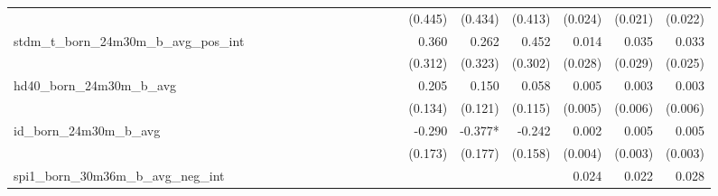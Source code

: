 \begin{tabular}{lrrrrrrrrrrrrrrrrrr}
                                            &              &              &              &              &              &              &              &              &               &              &              &               &      (0.445) &      (0.434) &       (0.413) &      (0.024) &      (0.021) &       (0.022) \\ 
stdm\_t\_born\_24m30m\_b\_avg\_pos\_int     &              &              &              &              &              &              &              &              &               &              &              &               &        0.360 &        0.262 &         0.452 &        0.014 &        0.035 &         0.033 \\ 
                                            &              &              &              &              &              &              &              &              &               &              &              &               &      (0.312) &      (0.323) &       (0.302) &      (0.028) &      (0.029) &       (0.025) \\ 
hd40\_born\_24m30m\_b\_avg                  &              &              &              &              &              &              &              &              &               &              &              &               &        0.205 &        0.150 &         0.058 &        0.005 &        0.003 &         0.003 \\ 
                                            &              &              &              &              &              &              &              &              &               &              &              &               &      (0.134) &      (0.121) &       (0.115) &      (0.005) &      (0.006) &       (0.006) \\ 
id\_born\_24m30m\_b\_avg                    &              &              &              &              &              &              &              &              &               &              &              &               &       -0.290 &      -0.377* &        -0.242 &        0.002 &        0.005 &         0.005 \\ 
                                            &              &              &              &              &              &              &              &              &               &              &              &               &      (0.173) &      (0.177) &       (0.158) &      (0.004) &      (0.003) &       (0.003) \\ 
spi1\_born\_30m36m\_b\_avg\_neg\_int        &              &              &              &              &              &              &              &              &               &              &              &               &              &              &               &        0.024 &        0.022 &         0.028 \\ 

\end{tabular}
